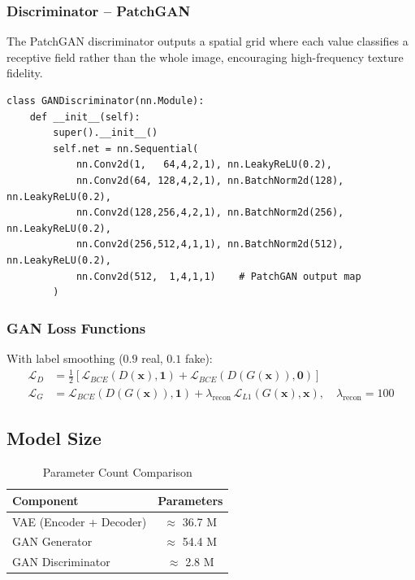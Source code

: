 \documentclass[12pt,a4paper]{article}
\begin{document}
\subsubsection{Discriminator -- PatchGAN}

The PatchGAN discriminator outputs a spatial grid where each value classifies a receptive field
rather than the whole image, encouraging high-frequency texture fidelity.

\begin{lstlisting}[caption={PatchGAN Discriminator}]
class GANDiscriminator(nn.Module):
    def __init__(self):
        super().__init__()
        self.net = nn.Sequential(
            nn.Conv2d(1,   64,4,2,1), nn.LeakyReLU(0.2),
            nn.Conv2d(64, 128,4,2,1), nn.BatchNorm2d(128), nn.LeakyReLU(0.2),
            nn.Conv2d(128,256,4,2,1), nn.BatchNorm2d(256), nn.LeakyReLU(0.2),
            nn.Conv2d(256,512,4,1,1), nn.BatchNorm2d(512), nn.LeakyReLU(0.2),
            nn.Conv2d(512,  1,4,1,1)    # PatchGAN output map
        )
\end{lstlisting}

\subsubsection{GAN Loss Functions}

With label smoothing ($0.9$ real, $0.1$ fake):
\begin{align}
\mathcal{L}_D &= \tfrac{1}{2}\!\left[\mathcal{L}_{BCE}\!\left(D(\mathbf{x}),\mathbf{1}\right)
                + \mathcal{L}_{BCE}\!\left(D(G(\mathbf{x})),\mathbf{0}\right)\right]\label{eq:ld}\\[4pt]
\mathcal{L}_G &= \mathcal{L}_{BCE}\!\left(D(G(\mathbf{x})),\mathbf{1}\right)
                + \lambda_{\mathrm{recon}}\,\mathcal{L}_{L1}\!\left(G(\mathbf{x}),\mathbf{x}\right),
                \quad\lambda_{\mathrm{recon}}=100\label{eq:lg}
\end{align}

\subsection{Model Size}

\begin{table}[H]
\centering
\caption{Parameter Count Comparison}
\begin{tabular}{lc}
\toprule
\textbf{Component}        & \textbf{Parameters} \\
\midrule
VAE (Encoder + Decoder)   & $\approx$ 36.7 M \\
GAN Generator             & $\approx$ 54.4 M \\
GAN Discriminator         & $\approx$ 2.8 M  \\
\bottomrule
\end{tabular}
\end{table}
\end{document}
